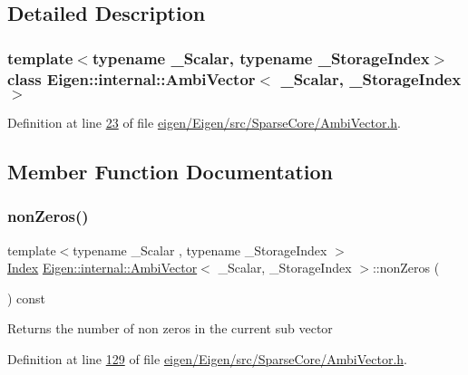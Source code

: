 \subsection{Detailed Description}
\subsubsection*{template$<$typename \+\_\+\+Scalar, typename \+\_\+\+Storage\+Index$>$\newline
class Eigen\+::internal\+::\+Ambi\+Vector$<$ \+\_\+\+Scalar, \+\_\+\+Storage\+Index $>$}



Definition at line \hyperlink{eigen_2_eigen_2src_2_sparse_core_2_ambi_vector_8h_source_l00023}{23} of file \hyperlink{eigen_2_eigen_2src_2_sparse_core_2_ambi_vector_8h_source}{eigen/\+Eigen/src/\+Sparse\+Core/\+Ambi\+Vector.\+h}.



\subsection{Member Function Documentation}
\mbox{\label{class_eigen_1_1internal_1_1_ambi_vector_ae0b137e95f52dea2320c16c379d27e74}} 
\subsubsection{\texorpdfstring{non\+Zeros()}{nonZeros()}}
{\footnotesize\ttfamily template$<$typename \+\_\+\+Scalar , typename \+\_\+\+Storage\+Index $>$ \\
\hyperlink{namespace_eigen_a62e77e0933482dafde8fe197d9a2cfde}{Index} \hyperlink{class_eigen_1_1internal_1_1_ambi_vector}{Eigen\+::internal\+::\+Ambi\+Vector}$<$ \+\_\+\+Scalar, \+\_\+\+Storage\+Index $>$\+::non\+Zeros (\begin{DoxyParamCaption}{ }\end{DoxyParamCaption}) const}

\begin{DoxyReturn}{Returns}
the number of non zeros in the current sub vector 
\end{DoxyReturn}


Definition at line \hyperlink{eigen_2_eigen_2src_2_sparse_core_2_ambi_vector_8h_source_l00129}{129} of file \hyperlink{eigen_2_eigen_2src_2_sparse_core_2_ambi_vector_8h_source}{eigen/\+Eigen/src/\+Sparse\+Core/\+Ambi\+Vector.\+h}.

